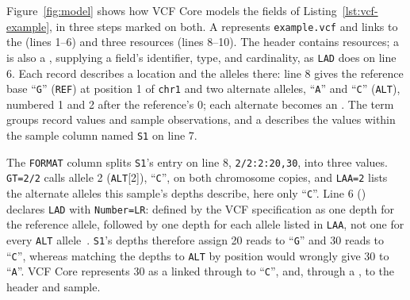 Figure~\ref{fig:model} shows how VCF Core models the fields of Listing~\ref{lst:vcf-example}, in three steps marked on both.
 A  represents \texttt{example.vcf} and links to the  (lines 1--6) and three  resources (lines 8--10).
The header contains  resources; a  is also a , supplying a field's identifier, type, and cardinality, as \texttt{LAD} does on line 6.
 Each record describes a location and the alleles there: line 8 gives the reference base ``\texttt{G}'' (\texttt{REF}) at position 1 of \texttt{chr1} and two alternate alleles, ``\texttt{A}'' and ``\texttt{C}'' (\texttt{ALT}), numbered 1 and 2 after the reference's 0; each alternate becomes an .
 The  term groups record values and sample observations, and a  describes the values within the sample column named \texttt{S1} on line 7.

The \texttt{FORMAT} column splits \texttt{S1}'s entry on line 8, \texttt{2/2:2:20,30}, into three values.
\texttt{GT=2/2} calls allele 2 (\texttt{ALT}[2]), ``\texttt{C}'', on both chromosome copies, and \texttt{LAA=2} lists the alternate alleles this sample's depths describe, here only ``\texttt{C}''.
Line 6 () declares \texttt{LAD} with \texttt{Number=LR}: defined by the VCF specification as one depth for the reference allele, followed by one depth for each allele listed in \texttt{LAA}, not one for every \texttt{ALT} allele~\cite{vcf45}.
\texttt{S1}'s depths therefore assign 20 reads to ``\texttt{G}'' and 30 reads to ``\texttt{C}'', whereas matching the depths to \texttt{ALT} by position would wrongly give 30 to ``\texttt{A}''.
VCF Core represents 30 as a  linked through  to ``\texttt{C}'', and, through a , to the header and sample.


